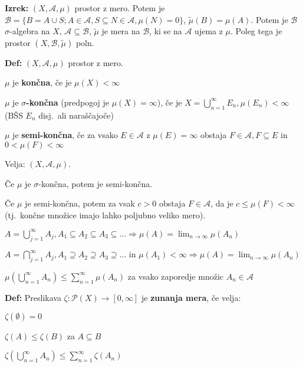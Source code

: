 \documentclass[a4paper,oneside,10pt]{article}
\theoremstyle{definition}
\newenvironment{itemize*}{\vspace{-10pt}\begin{itemize}\setlength{\itemsep}{0pt}\setlength{\parskip}{2pt}}{\end{itemize}}
\newcommand{\A}{\ensuremath{\mathcal{A}}}
\newcommand{\B}{\ensuremath{\mathcal{B}}}
\begin{document}
\textbf{Izrek:} $(X, \A, \mu)$ prostor z mero. Potem je
$\B = \{ B = A \cup S; A \in \A, S \subseteq N \in \A, \mu(N) = 0 \}$,
$\tilde{\mu} (B) = \mu(A)$. Potem je $\B$ $\sigma$-algebra na $X$,
$\A \subseteq \B$, $\tilde{\mu}$ je mera na $\B$, ki se na $\A$ ujema z $\mu$.
Poleg tega je prostor $(X, \B, \tilde{\mu})$ poln.

\textbf{Def:} $(X, \A, \mu)$ prostor z mero.
\begin{itemize*}
  \item $\mu$ je \textbf{končna}, če je $\mu(X) < \infty$
  \item $\mu$ je \textbf{$\sigma$-končna} (predpogoj je $\mu(X) = \infty$),
    če je $X = \bigcup_{n=1}^\infty E_n, \mu(E_n) < \infty$ (BŠS $E_n$ disj.\ ali naraščajoče)
  \item $\mu$ je \textbf{semi-končna}, če za vsako $E\in \A$ z $\mu(E) = \infty$
    obstaja $F \in \A, F \subseteq E$ in $0 < \mu(F) < \infty$
\end{itemize*}

Velja: $(X, \A, \mu)$.
\begin{itemize*}
  \item Če $\mu$ je $\sigma$-končna, potem je semi-končna. %
  \item Če $\mu$ je semi-končna, potem za vsak $c > 0$ obstaja $F \in \A$, da je
    $c \leq \mu(F) < \infty$ (tj.\ končne množice imajo lahko poljubno veliko
    mero).
  \item $A = \bigcup_{j = 1}^\infty A_j, A_1 \subseteq A_2 \subseteq A_3 \subseteq
    \ldots \Rightarrow  \mu(A) = \lim_{n \to \infty} \mu(A_n)$
  \item $A = \bigcap_{j = 1}^\infty A_j, A_1 \supseteq A_2 \supseteq A_3 \supseteq
    \ldots \text{ in } \mu(A_1) < \infty \Rightarrow  \mu(A) = \lim_{n \to \infty} \mu(A_n)$
  \item $\mu(\bigcup_{n=1}^\infty A_n) \leq \sum_{n = 1}^\infty \mu(A_n)$ za
    vsako zaporedje množic $A_n \in \A$
\end{itemize*}

\textbf{Def:} Preslikava $\zeta \colon \mathcal{P}(X) \to [0, \infty]$ je \textbf{zunanja mera}, če velja:
\begin{itemize*}
  \item $\zeta(\emptyset) = 0$
  \item $\zeta(A) \leq \zeta(B)$ za $A \subseteq B$
  \item $\zeta(\bigcup_{n = 1}^\infty A_n) \leq \sum_{n = 1}^\infty \zeta(A_n)$
\end{itemize*}
\end{document}
